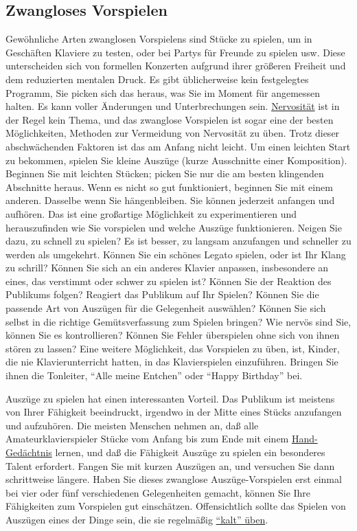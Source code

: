 
\subsection{Zwangloses Vorspielen}\hypertarget{c1iii14e}{}

Gewöhnliche Arten zwanglosen Vorspielens sind Stücke zu spielen, um in Geschäften Klaviere zu testen, oder bei Partys für Freunde zu spielen usw.
Diese unterscheiden sich von formellen Konzerten aufgrund ihrer größeren Freiheit und dem reduzierten mentalen Druck.
Es gibt üblicherweise kein festgelegtes Programm, Sie picken sich das heraus, was Sie im Moment für angemessen halten.
Es kann voller Änderungen und Unterbrechungen sein.
\hyperlink{c1iii15}{Nervosität} ist in der Regel kein Thema, und das zwanglose Vorspielen ist sogar eine der besten Möglichkeiten, Methoden zur Vermeidung von Nervosität zu üben.
Trotz dieser abschwächenden Faktoren ist das am Anfang nicht leicht.
Um einen leichten Start zu bekommen, spielen Sie kleine Auszüge (kurze Ausschnitte einer Komposition).
Beginnen Sie mit leichten Stücken; picken Sie nur die am besten klingenden Abschnitte heraus.
Wenn es nicht so gut funktioniert, beginnen Sie mit einem anderen. Dasselbe wenn Sie hängenbleiben.
Sie können jederzeit anfangen und aufhören.
Das ist eine großartige Möglichkeit zu experimentieren und herauszufinden wie Sie vorspielen und welche  Auszüge funktionieren.
Neigen Sie dazu, zu schnell zu spielen?
Es ist besser, zu langsam anzufangen und schneller zu werden als umgekehrt.
Können Sie ein schönes Legato spielen, oder ist Ihr Klang zu schrill?
Können Sie sich an ein anderes Klavier anpassen, insbesondere an eines, das verstimmt oder schwer zu spielen ist?
Können Sie der Reaktion des Publikums folgen?
Reagiert das Publikum auf Ihr Spielen?
Können Sie die passende Art von Auszügen für die Gelegenheit auswählen?
Können Sie sich selbst in die richtige Gemütsverfassung zum Spielen bringen?
Wie nervös sind Sie, können Sie es kontrollieren?
Können Sie Fehler überspielen ohne sich von ihnen stören zu lassen?
Eine weitere Möglichkeit, das Vorspielen zu üben, ist, Kinder, die nie Klavierunterricht hatten, in das Klavierspielen einzuführen.
Bringen Sie ihnen die Tonleiter, \enquote{Alle meine Entchen} oder \enquote{Happy Birthday} bei.

Auszüge zu spielen hat einen interessanten Vorteil. Das Publikum ist meistens von Ihrer Fähigkeit beeindruckt, irgendwo in der Mitte eines Stücks anzufangen und aufzuhören.
Die meisten Menschen nehmen an, daß alle Amateurklavierspieler Stücke vom Anfang bis zum Ende mit einem \hyperlink{c1iii6d}{Hand-Gedächtnis} lernen, und daß die Fähigkeit Auszüge zu spielen ein besonderes Talent erfordert.
Fangen Sie mit kurzen Auszügen an, und versuchen Sie dann schrittweise längere.
Haben Sie dieses zwanglose Auszüge-Vorspielen erst einmal bei vier oder fünf verschiedenen Gelegenheiten gemacht, können Sie Ihre Fähigkeiten zum Vorspielen gut einschätzen.
Offensichtlich sollte das Spielen von Auszügen eines der Dinge sein, die sie regelmäßig \hyperlink{c1iii6g}{\enquote{kalt} üben}.

